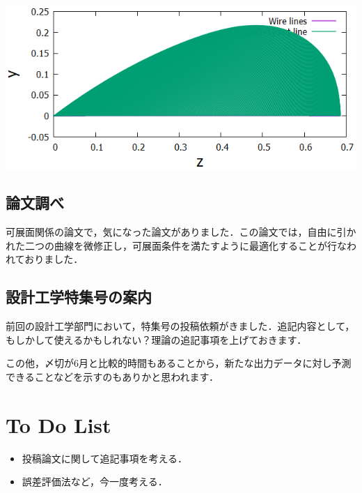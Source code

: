 \documentclass[11pt]{jsarticle}
\begin{document}
			\bfig[H]
			\includegraphics[scale = 0.5]{./figure/ObtainedRidgeLinefromz-y.png}
			\efig
		\subsection{論文調べ}
			可展面関係の論文で，気になった論文がありました．この論文では，自由に引かれた二つの曲線を微修正し，可展面条件を満たすように最適化することが行なわれておりました．
		\subsection{設計工学特集号の案内}
			前回の設計工学部門において，特集号の投稿依頼がきました．追記内容として，もしかして使えるかもしれない？理論の追記事項を上げておきます．
			
			
			
			この他，〆切が6月と比較的時間もあることから，新たな出力データに対し予測できることなどを示すのもありかと思われます．
	\section{To Do List}
		\begin{itemize}
			\item 投稿論文に関して追記事項を考える．
			\item 誤差評価法など，今一度考える．
		\end{itemize}
				
	\newpage
\vspace{10cm}
	

\vspace{14cm}
	\articleSPRfour
	\articleSPRfive
\end{document}
